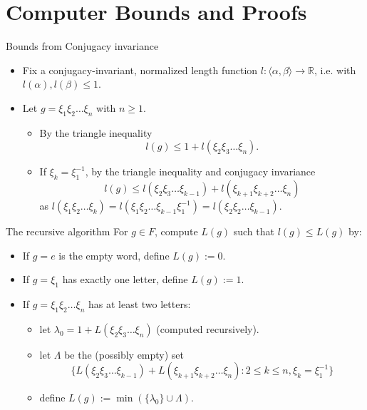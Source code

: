 \documentclass[aspectratio=1610,17pt, ucs]{beamer}
\newcommand{\R}{\mathbb{R}}
\newcommand{\F}{\langle \alpha, \beta \rangle}
\begin{document}
\section{Computer Bounds and Proofs}

\begin{frame}{Bounds from Conjugacy invariance}
  \begin{itemize}[<+->]
    \item Fix a conjugacy-invariant, \alert{normalized} length function $l: \F \to \R$, i.e. with $l(\alpha), l(\beta)\leq 1$.
    \item Let $g=\xi_1\xi_2\dots \xi_n$ with $n \geq 1$.
    \begin{itemize}
      \item\label{plus1} By the triangle inequality $$l(g) \leq 1 + l(\xi_2\xi_3\dots \xi_n).$$
      \item\label{pair} If $\xi_k = \xi_1^{-1}$, by the triangle inequality and conjugacy invariance
       $$l(g)\leq l(\xi_2\xi_3\dots \xi_{k-1}) + l(\xi_{k+1}\xi_{k+2}\dots \xi_n)$$ as 
         $l(\xi_1\xi_2\dots \xi_k) = l(\xi_1\xi_2\dots \xi_{k-1}\xi_1^{-1}) = l(\xi_2\xi_2\dots \xi_{k-1})$.
      
    \end{itemize}
  \end{itemize}
  
\end{frame}

\begin{frame}{The recursive algorithm}
  For $g\in F$, compute $L(g)$ such that $l(g)\leq L(g)$ by:
  \begin{itemize}[<+->]
    \item If $g = e$ is the empty word, \alert{define} $L(g) := 0$.
    \item If $g=\xi_1$ has exactly one letter, \alert{define} $L(g) := 1$.
    \item If $g = \xi_1\xi_2\dots \xi_n$ has at least two letters:
    \begin{itemize}
      \item let $\lambda_0 = 1 + L(\xi_2\xi_3\dots \xi_n)$ (computed recursively).
      \item let $\Lambda$ be the (possibly empty) set
      $$\{L(\xi_2\xi_3\dots \xi_{k-1}) + L(\xi_{k+1}\xi_{k+2}\dots \xi_n): 2 \leq k\leq n, \xi_k = \xi_1^{-1}\}$$
      \item \alert{define} $L(g) := \min(\{\lambda_0\}\cup \Lambda)$.
    \end{itemize}
  \end{itemize}
\end{frame}
\end{document}
